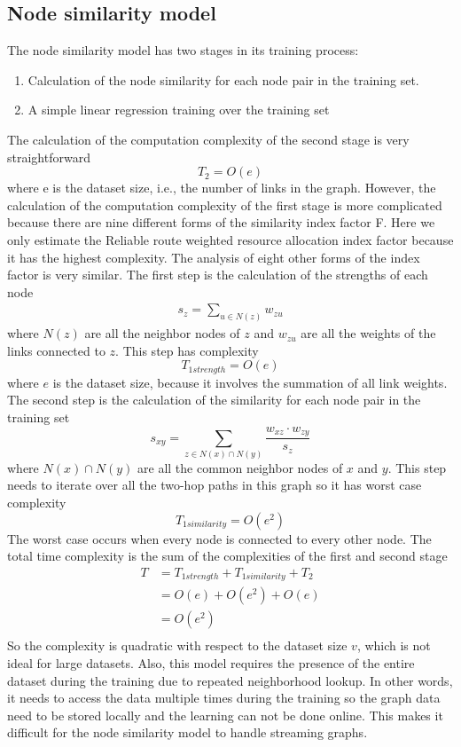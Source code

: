 \documentclass[12pt]{WSUThesis}
\theoremstyle{definition}
\begin{document}
\subsection{Node similarity model}
The node similarity model has two stages in its training process:
\begin{enumerate}
	\item Calculation of the node similarity for each node pair in the training set.
	\item A simple linear regression training over the training set
\end{enumerate}
The calculation of the computation complexity of the second stage is very straightforward
\[T_2 = O(e)\]
where e is the dataset size, i.e., the number of links in the graph. However, the calculation of the computation complexity of the first stage is more complicated because there are nine different forms of the similarity index factor F. Here we only estimate the Reliable route weighted resource allocation index factor because it has the highest complexity. The analysis of eight other forms of the index factor is very similar.
The first step is the calculation of the strengths of each node
\begin{align*}
	s_z = \sum_{u \in N(z)} w_{zu}
\end{align*}
where $ N(z) $ are all the neighbor nodes of $ z $ and $ w_{zu} $ are all the weights of the links connected to $ z $. This step has complexity
\[T_{1strength} = O(e)\]
where $ e $ is the dataset size, because it involves the summation of all link weights.
The second step is the calculation of the similarity for each node pair in the training set
\[s_{xy} = \sum_{z \in N(x) \cap N(y)} \frac{w_{xz} \cdot w_{zy}}{s_z}\]
where $ N(x) \cap N(y) $ are all the common neighbor nodes of $ x $ and $ y $. This step needs to iterate over all the two-hop paths in this graph so it has worst case complexity
\[T_{1similarity} = O(e^2)\]
The worst case occurs when every node is connected to every other node.
The total time complexity is the sum of the complexities of the first and second stage
\begin{align*}
	T
	&= T_{1strength} + T_{1similarity} + T_2 \\
	&= O(e) + O(e^2) + O(e) \\
	&= O(e^2) \\
\end{align*}
So the complexity is quadratic with respect to the dataset size $ v $, which is not ideal for large datasets.
Also, this model requires the presence of the entire dataset during the training due to repeated neighborhood lookup.
In other words, it needs to access the data multiple times during the training so the graph data need to be stored locally and the learning can not be done online.
This makes it difficult for the node similarity model to handle streaming graphs.
\end{document}
